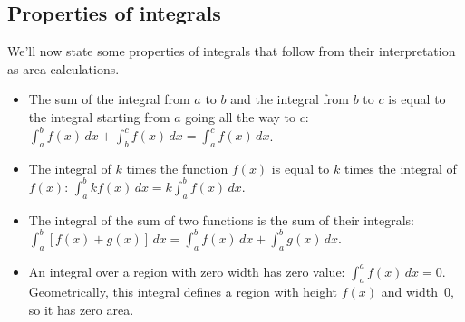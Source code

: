 


	\subsection{Properties of integrals}

		We'll now state some properties of integrals that follow from their interpretation as area calculations.

		\begin{itemize}

			\item The sum of the integral from $a$ to $b$
				and the integral from $b$ to $c$
				is equal to the integral starting from $a$ going all the way to $c$:
				$\int_a^b f(x) \, dx + \int_b^c f(x) \, dx = \int_a^c f(x) \, dx$.


			\item The integral of $k$ times the function $f(x)$
				is equal to $k$ times the integral of $f(x)$:
				$\int_a^b kf(x)\, dx = k\int_a^b f(x)\, dx$.

			\item The integral of the sum of two functions
				is the sum of their integrals:
				$\int_a^b [f(x) + g(x)]\, dx = \int_a^b f(x)\, dx +  \int_a^b g(x)\, dx$.


			\item An integral over a region with zero width has zero value:
				$\int_a^a f(x)\, dx = 0$.
				Geometrically,
				this integral defines a region with height $f(x)$ and width~$0$,
				so it has zero area.


			

		\end{itemize}

